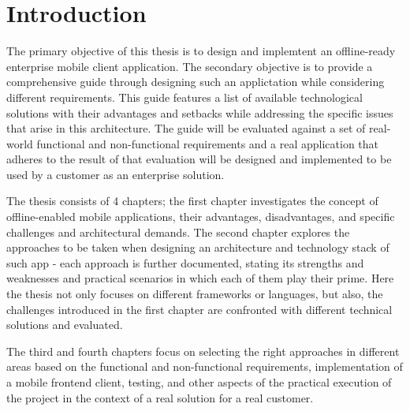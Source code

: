 \documentclass[
  digital,     %
  color,       %
  oneside,     %
  nosansbold,  %
  nocolorbold, %
  lof,         %
  lot,         %
]{fithesis4}
\begin{document}
\chapter*{Introduction}

The primary objective of this thesis is to design and implemtent an offline-ready enterprise mobile client application. The secondary objective is to provide a comprehensive guide through designing such an applictation while considering different requirements. This guide features a list of available technological solutions with their advantages and setbacks while addressing the specific issues that arise in this architecture. The guide will be evaluated against a set of real-world functional and non-functional requirements and a real application that adheres to the result of that evaluation will be designed and implemented to be used by a customer as an enterprise solution.

The thesis consists of 4 chapters; the first chapter investigates the concept of offline-enabled mobile applications, their advantages, disadvantages, and specific challenges and architectural demands. The second chapter explores the approaches to be taken when designing an architecture and technology stack of such app - each approach is further documented, stating its strengths and weaknesses and practical scenarios in which each of them play their prime. Here the thesis not only focuses on different frameworks or languages, but also, the challenges introduced in the first chapter are confronted with different technical solutions and evaluated.

The third and fourth chapters focus on selecting the right approaches in different areas based on the functional and non-functional requirements, implementation of a mobile frontend client, testing, and other aspects of the practical execution of the project in the context of a real solution for a real customer.
\end{document}
